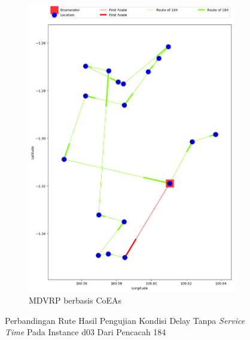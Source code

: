 \begin{figure}[H]
	\centering
	\begin{subfigure}[t]{\textwidth}
		\centering
		\includegraphics[width=\textwidth]{Resources/Images/delayed_3/real_m15_n100_delayed_3_184_coes}
		\caption{MDVRP berbasis CoEAs}
		\label{fig:real_m15_n100_delayed_3_184_coes}
	\end{subfigure}
	\caption{Perbandingan Rute Hasil Pengujian Kondisi Delay Tanpa \textit{Service Time} Pada Instance d03 Dari Pencacah 184}
	\label{fig:real_m15_n100_delayed_3_184}
\end{figure}


